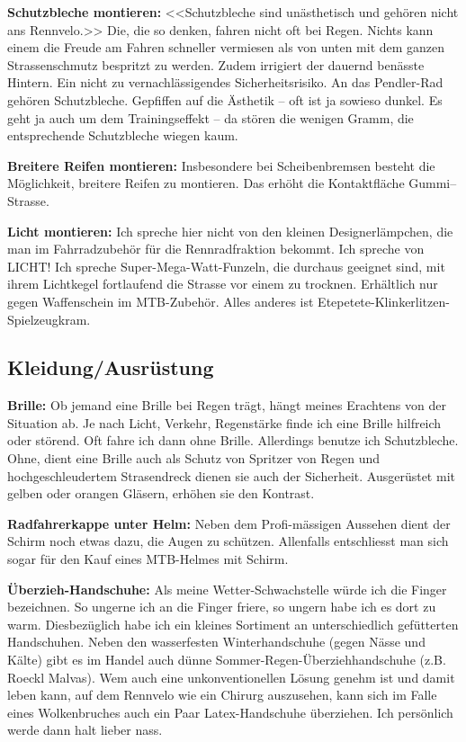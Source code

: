 \textbf{Schutzbleche montieren:}
<<Schutzbleche sind unästhetisch und gehören nicht ans Rennvelo.>>
Die, die so denken, fahren nicht oft bei Regen.
Nichts kann einem die Freude am Fahren schneller vermiesen als von unten mit dem ganzen Strassenschmutz bespritzt zu werden.
Zudem irrigiert der dauernd benässte Hintern. Ein nicht zu vernachlässigendes Sicherheitsrisiko.
An das Pendler-Rad gehören Schutzbleche.
Gepfiffen auf die Ästhetik -- oft ist ja sowieso dunkel.
Es geht ja auch um dem Trainingseffekt -- da stören die wenigen Gramm, die entsprechende Schutzbleche wiegen kaum.

\textbf{Breitere Reifen montieren:} 
Insbesondere bei Scheibenbremsen besteht die Möglichkeit, breitere Reifen zu montieren.
Das erhöht die Kontaktfläche Gummi--Strasse.

\textbf{Licht montieren:}
Ich spreche hier nicht von den kleinen Designerlämpchen, die man im Fahrradzubehör für die Rennradfraktion bekommt.
Ich spreche von LICHT!
Ich spreche Super-Mega-Watt-Funzeln, die durchaus geeignet sind, mit ihrem Lichtkegel fortlaufend die Strasse vor einem zu trocknen.
Erhältlich nur gegen Waffenschein im MTB-Zubehör.
Alles anderes ist Etepetete-Klinkerlitzen-Spielzeugkram.

\subsection{Kleidung/Ausrüstung}

\textbf{Brille:}
Ob jemand eine Brille bei Regen trägt, hängt meines Erachtens von der Situation ab.
Je nach Licht, Verkehr, Regenstärke finde ich eine Brille hilfreich oder störend.
Oft fahre ich dann ohne Brille.
Allerdings benutze ich Schutzbleche.
Ohne, dient eine Brille auch als Schutz von Spritzer von Regen und hochgeschleudertem Strasendreck dienen sie auch der Sicherheit.
Ausgerüstet mit gelben oder orangen Gläsern, erhöhen sie den Kontrast.

\textbf{Radfahrerkappe unter Helm:}
Neben dem Profi-mässigen Aussehen dient der Schirm noch etwas dazu, die Augen zu schützen.
Allenfalls entschliesst man sich sogar für den Kauf eines MTB-Helmes mit Schirm.

\textbf{Überzieh-Handschuhe:}
Als meine Wetter-Schwachstelle würde ich die Finger bezeichnen.
So ungerne ich an die Finger friere, so ungern habe ich es dort zu warm.
Diesbezüglich habe ich ein kleines Sortiment an unterschiedlich gefütterten Handschuhen.
Neben den wasserfesten Winterhandschuhe (gegen Nässe und Kälte) gibt es im Handel auch dünne Sommer-Regen-Überziehhandschuhe
(z.B. Roeckl Malvas).
Wem auch eine unkonventionellen Lösung genehm ist und damit leben kann, auf dem Rennvelo wie ein Chirurg auszusehen,
kann sich im Falle eines Wolkenbruches auch ein Paar Latex-Handschuhe überziehen.
Ich persönlich werde dann halt lieber nass.

